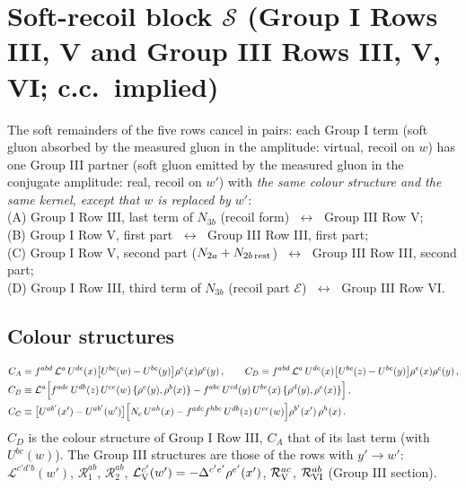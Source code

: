\documentclass[9pt]{article}
\numberwithin{equation}{section}
\begin{document}
{\color{red}
\section{Soft-recoil block $\mathcal{S}$ (Group I Rows III, V and Group III Rows III, V, VI; c.c.\ implied)}\label{sec:fx-soft}
 The soft remainders of the five rows cancel in pairs: each Group I term (soft gluon absorbed by the measured gluon in the amplitude: virtual, recoil on $w$) has one Group III partner (soft gluon emitted by the measured gluon in the conjugate amplitude: real, recoil on $w'$) with \emph{the same colour structure and the same kernel, except that $w$ is replaced by $w'$}:\\[2pt]
\hspace*{1em}(A) Group I Row III, last term of $N_{3b}$ (recoil form) $\;\leftrightarrow\;$ Group III Row V;\\
\hspace*{1em}(B) Group I Row V, first part $\;\leftrightarrow\;$ Group III Row III, first part;\\
\hspace*{1em}(C) Group I Row V, second part ($N_{2a}+N_{2b\,\rm rest}$) $\;\leftrightarrow\;$ Group III Row III, second part;\\
\hspace*{1em}(D) Group I Row III, third term of $N_{3b}$ (recoil part $\mathcal{E}$) $\;\leftrightarrow\;$ Group III Row VI.

\subsection*{Colour structures}
\begin{align}
C_{A}&\equiv f^{abd}\,\mathcal{L}^{a}\,U^{de}(x)\big[U^{bc}(w)-U^{bc}(y)\big]\rho^{e}(x)\rho^{c}(y)\,,\qquad
C_{D}\equiv f^{abd}\,\mathcal{L}^{a}\,U^{de}(x)\big[U^{bc}(z)-U^{bc}(y)\big]\rho^{e}(x)\rho^{c}(y)\,,\notag\\
C_{B}&\equiv \mathcal{L}^{a}\Big[f^{adc}\,U^{db}(z)\,U^{ce}(w)\,\{\rho^{e}(y),\rho^{b}(x)\}-f^{abc}\,U^{cd}(y)\,U^{be}(x)\,\{\rho^{d}(y),\rho^{e}(x)\}\Big]\,,\label{eq:fx-col}\\
C_{C}&\equiv\big[U^{ab'}(x')-U^{ab'}(w')\big]\Big[N_{c}\,U^{ah}(x)-f^{adc}f^{hbe}\,U^{db}(z)\,U^{ce}(w)\Big]\rho^{b'}(x')\,\rho^{h}(x)\,.\notag
\end{align}
$C_{D}$ is the colour structure of Group I Row III, $C_{A}$ that of its last term (with $U^{bc}(w)$). The Group III structures are those of the rows with $y'\to w'$: $\mathcal{L}^{c'd'b}(w')$, $\mathcal{R}_{1}^{ab}$, $\mathcal{R}_{2}^{ab}$, $\mathcal{L}_{\rm V}^{c'}(w')=-\Delta^{c'e'}\rho^{e'}(x')$, $\mathcal{R}_{\rm V}^{ac}$, $\mathcal{R}_{\rm VI}^{ab}$ (Group III section).

}
\end{document}
